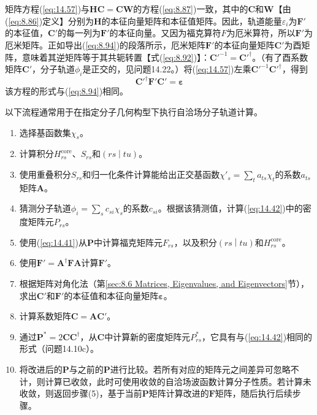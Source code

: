     矩阵方程(\ref{eq:14.57})与$\mathbf{HC}=\mathbf{CW}$的方程(\ref{eq:8.87})一致，其中的$\mathbf{C}$和$\mathbf{W}$【由(\ref{eq:8.86})定义】分别为$\mathbf{H}$的本征向量矩阵和本征值矩阵。因此，轨道能量$\varepsilon_i$为$\mathbf{F'}$的本征值，$\mathbf{C'}$的每一列为$\mathbf{F'}$的本征向量。又因为福克算符$\hat{F}$为厄米算符，所以$\mathbf{F'}$为厄米矩阵。正如导出(\ref{eq:8.94})的段落所示，厄米矩阵$\mathbf{F'}$的本征向量矩阵$\mathbf{C'}$为酉矩阵，意味着其逆矩阵等于其共轭转置【式(\ref{eq:8.92})】：$\mathbf{C'}^{-1} = \mathbf{C'}^{\dagger}$。（有了酉系数矩阵$\mathbf{C'}$，分子轨道$\phi_i$是正交的，见问题14.22。）将(\ref{eq:14.57})左乘$\mathbf{C'}^{-1}\mathbf{C'}^{\dagger}$，得到
    \begin{equation}
        \mathbf{C'}^{\dagger} \mathbf{F'} \mathbf{C'} = \symbf{\varepsilon}
        \label{eq:14.58}
    \end{equation}
    该方程的形式与(\ref{eq:8.94})相同。

    以下流程通常用于在指定分子几何构型下执行自洽场分子轨道计算。
    \begin{enumerate}
        \item 选择基函数集$\chi_s$。
        \item 计算积分$H^{\text{core}}_{rs}$、$S_{rs}$和$\left(rs \middle| tu\right)$。
        \item 使用重叠积分$S_{rs}$和归一化条件计算能给出正交基函数$\chi'_s = \sum_t a_{ts} \chi_t$的系数$a_{ts}$矩阵$\mathbf{A}$。
        \item 猜测分子轨道$\phi_i = \sum_s c_{si} \chi_s$的系数$c_{si}$。根据该猜测值，计算(\ref{eq:14.42})中的密度矩阵元$P_{rs}$。
        \item 使用(\ref{eq:14.41})从$\mathbf{P}$中计算福克矩阵元$F_{rs}$，以及积分$\left(rs \middle| tu\right)$和$H^{\text{core}}_{rs}$。
        \item 使用$\mathbf{F'} = \mathbf{A}^{\dagger} \mathbf{FA}$计算$\mathbf{F'}$。
        \item 根据矩阵对角化法（第\ref{sec:8.6 Matrices, Eigenvalues, and Eigenvectors}节），求出$\mathbf{C'}$和$\mathbf{F'}$的本征值和本征向量矩阵$\symbf{\varepsilon}$。
        \item 计算系数矩阵$\mathbf{C} = \mathbf{A}\mathbf{C'}$。
        \item 通过$\mathbf{P}^* = 2\mathbf{CC}^{\dagger}$，从$\mathbf{C}$中计算新的密度矩阵元$P_{rs}^*$，它具有与(\ref{eq:14.42})相同的形式（问题14.10c）。
        \item 将改进后的$\mathbf{P}$与之前的$\mathbf{P}$进行比较。若所有对应的矩阵元之间差异可忽略不计，则计算已收敛，此时可使用收敛的自洽场波函数计算分子性质。若计算未收敛，则返回步骤(5)，基于当前$\mathbf{P}$矩阵计算改进的$\mathbf{F}$矩阵，随后执行后续步骤。
    \end{enumerate}

